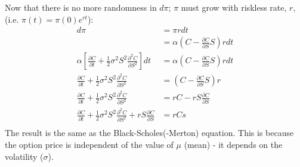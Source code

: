 \documentclass[12pt]{article}
\begin{document}
    Now that there is no more randomness in $d\pi$; $\pi$ must grow with riskless rate, $r$, (i.e. $\pi(t) = \pi(0) e^{rt}$):
    \begin{align*}
      d\pi &= \pi r dt \\[10pt]
           &= \alpha \left(C - \frac{\partial C}{\partial S} S \right) r dt \\[10pt]
      \alpha \left[ \frac{\partial C}{\partial t} + \frac{1}{2} \sigma^2 S^2 \frac{\partial^2 C}{\partial S^2} \right] dt &= \alpha \left(C - \frac{\partial C}{\partial S} S \right) r dt \\[10pt]
      \frac{\partial C}{\partial t} + \frac{1}{2} \sigma^2 S^2 \frac{\partial^2 C}{\partial S^2} &= \left(C - \frac{\partial C}{\partial S} S \right) r\\[10pt]
      \frac{\partial C}{\partial t} + \frac{1}{2} \sigma^2 S^2
      \frac{\partial^2 C}{\partial S^2} &= rC - rS \frac{\partial C}{\partial S} \\[10pt]
      \frac{\partial C}{\partial t} + \frac{1}{2} \sigma^2 S^2 \frac{\partial^2 C}{\partial S^2} + rS \frac{\partial C}{\partial S} &= rC s \\
    \end{align*}
    The result is the same as the Black-Scholes(-Merton) equation. This is because the option price is independent of the value of $\mu$ (mean) - it depends on the volatility ($\sigma$). 

    \clearpage
  
\end{document}
